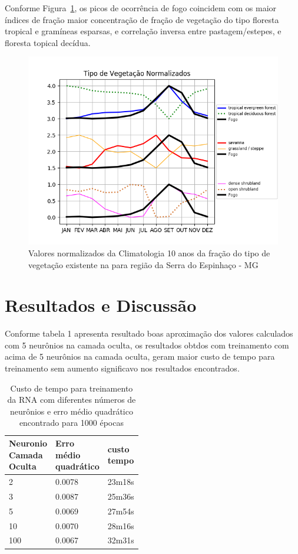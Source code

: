 \documentclass[conference]{IEEEtran}
\begin{document}
Conforme Figura~\ref{inputNormFrac}, os picos de ocorrência de fogo coincidem com os maior índices de fração maior concentração de fração de vegetação do tipo floresta tropical e gramíneas esparsas,  e correlação inversa entre pastagem/estepes, e floresta topical decídua.\\
\begin{figure}[htbp]
\centerline{\includegraphics[width=0.44\paperwidth]{figuras/normveg.png}}
\caption{Valores normalizados da Climatologia 10 anos da fração do tipo de vegetação existente na para região da Serra do Espinhaço - MG}
\label{inputNormFrac}
\end{figure}


\section{Resultados e Discussão}
Conforme tabela 1  apresenta resultado boas aproximação dos valores calculados com 5 neurônios na camada oculta, os resultados obtdos com treinamento com acima de 5 neurônios na camada oculta, geram maior custo de tempo para treinamento sem aumento significavo nos resultados encontrados.\\


\begin{table}[htbp]
  \centering
  \begin{tabular}    {p{0.15\linewidth}p{0.15\linewidth}p{0.15\linewidth}}
    \hline
    Neuronio Camada Oculta & Erro médio quadrático & custo tempo\\
    \hline
    2 & 0.0078 & 23m18s\\
    3 & 0.0087 & 25m36s\\
    5 & 0.0069 & 27m54s\\
    10 & 0.0070 & 28m16s\\
    100 & 0.0067 & 32m31s\\
    \hline
  \end{tabular}
  \label{custoTempo}
  \caption{Custo de tempo para treinamento da RNA com diferentes números de neurônios e erro médio quadrático encontrado para 1000 épocas}
\end{table}
\end{document}
